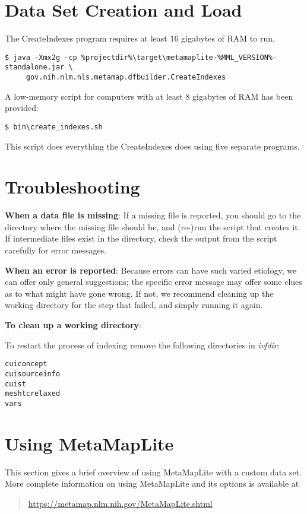 \documentclass[letterpaper,article]{memoir}
\def\bf{\bfseries}
\begin{document}
\chapter{Data Set Creation and Load} \label{Loading}

The CreateIndexes program requires at least 16 gigabytes of RAM to run.

\begin{verbatim}
$ java -Xmx2g -cp %projectdir%\target\metamaplite-%MML_VERSION%-standalone.jar \
     gov.nih.nlm.nls.metamap.dfbuilder.CreateIndexes
\end{verbatim}

A low-memory script for computers with at least 8 gigabytes of RAM has
been provided:

\begin{verbatim}
$ bin\create_indexes.sh
\end{verbatim}

This script does everything the CreateIndexes does using five separate
programs.

\chapter{Troubleshooting}\label{Troubleshooting}

{\bf When a data file is missing}:
If a missing file is reported,
you should go to the directory where the missing file should be,
and (re-)run the script that creates it.
If intermediate files exist in the directory,
check the output from the script carefully for error messages.

{\bf When an error is reported}:
Because errors can have such varied etiology,
we can offer only general suggestions;
the specific error message may offer some clues as to what might have gone wrong.
If not, we recommend cleaning up the working directory for the step that failed,
and simply running it again.

{\bf To clean up a working directory}:

To restart the process of indexing remove the following directories in {\it ivfdir}:

\begin{verbatim}
cuiconcept
cuisourceinfo
cuist
meshtcrelaxed
vars
\end{verbatim}

\chapter{Using MetaMapLite}\label{Using MetaMapLite}
This section gives a brief overview of using MetaMapLite with a custom
data set. More complete information on using MetaMapLite and its options
is available at
\begin{quote}
\url{https://metamap.nlm.nih.gov/MetaMapLite.shtml}
\end{quote}
\end{document}

